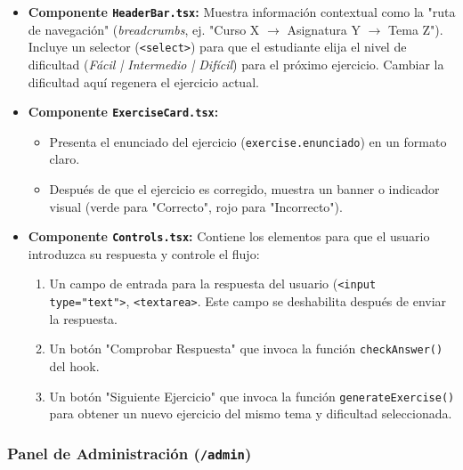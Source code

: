 \begin{itemize}[leftmargin=*]
  \item \textbf{Componente \texttt{HeaderBar.tsx}:} Muestra información contextual como la "ruta de navegación" (\emph{breadcrumbs}, ej. "Curso X \(\rightarrow\) Asignatura Y \(\rightarrow\) Tema Z"). Incluye un selector (\texttt{<select>}) para que el estudiante elija el nivel de dificultad (\emph{Fácil | Intermedio | Difícil}) para el próximo ejercicio. Cambiar la dificultad aquí regenera el ejercicio actual.

  \item \textbf{Componente \texttt{ExerciseCard.tsx}:}
        \begin{itemize}
            \item Presenta el enunciado del ejercicio (\texttt{exercise.enunciado}) en un formato claro.
            \item Después de que el ejercicio es corregido, muestra un banner o indicador visual (verde para "Correcto", rojo para "Incorrecto").
        \end{itemize}

  \item \textbf{Componente \texttt{Controls.tsx}:} Contiene los elementos para que el usuario introduzca su respuesta y controle el flujo:
        \begin{enumerate}[label=\alph*)]
          \item Un campo de entrada para la respuesta del usuario (\texttt{<input type="text">}, \texttt{<textarea>}. Este campo se deshabilita después de enviar la respuesta.
          \item Un botón "Comprobar Respuesta" que invoca la función \texttt{checkAnswer()} del hook.
          \item Un botón "Siguiente Ejercicio" que invoca la función \texttt{generateExercise()} para obtener un nuevo ejercicio del mismo tema y dificultad seleccionada.
        \end{enumerate}
\end{itemize}

\subsubsection{Panel de Administración (\texttt{/admin})}
\label{sssec:desarrollo_admin_dashboard}

